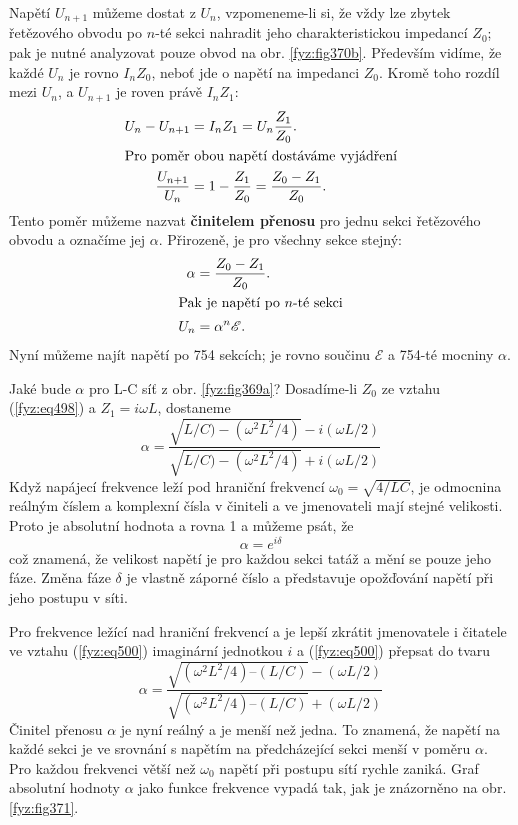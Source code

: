 {  Napětí \(U_{n+1}\) můžeme dostat z \(U_n\), vzpomeneme-li si, že vždy lze zbytek řetězového 
  obvodu po \(n\)-té sekci nahradit jeho charakteristickou impedancí \(Z_0\); pak je nutné 
  analyzovat pouze obvod na obr. \ref{fyz:fig370b}. Především vidíme, že každé \(U_n\) je rovno 
  \(I_nZ_0\), neboť jde o napětí na impedanci \(Z_0\). Kromě toho rozdíl mezi \(U_n\), a 
  \(U_{n+1}\) je roven právě \(I_nZ_1\):
  \begin{align*}
    U_n - U_{n+1}       &= I_nZ_1 = U_n\frac{Z_1}{Z_0}.  \\
    \shortintertext{Pro poměr obou napětí dostáváme vyjádření} 
    \frac{U_{n+1}}{U_n} &= 1 - \frac{Z_1}{Z_0} = \frac{Z_0 -Z_1}{Z_0}.
  \end{align*}
  Tento poměr můžeme nazvat \textbf{činitelem přenosu} pro jednu sekci řetězového obvodu a označíme 
  jej \(\alpha\). Přirozeně, je pro všechny sekce stejný: 
  \begin{align*}
    \alpha  &= \frac{Z_0 -Z_1}{Z_0}.  \\
    \shortintertext{Pak je napětí po \(n\)-té sekci} 
    U_n     &= \alpha^n\mathscr{E}.
  \end{align*}
  Nyní můžeme najít napětí po \num{754} sekcích; je rovno součinu \(\mathscr{E}\) a \num{754}-té 
  mocniny \(\alpha\). 
  
  Jaké bude \(\alpha\) pro L-C síť z obr. \ref{fyz:fig369a}? Dosadíme-li \(Z_0\) ze vztahu 
  (\ref{fyz:eq498}) a \(Z_1 =i\omega L\), dostaneme
  \begin{equation}\label{fyz:eq500}
    \alpha = \dfrac{\sqrt{L/C) - (\omega^2L^2/4)} - i(\omega L/2)}
                   {\sqrt{L/C) - (\omega^2L^2/4)} + i(\omega L/2)}
  \end{equation}
  Když napájecí frekvence leží pod hraniční frekvencí \(\omega_0 =\sqrt{4/LC}\), je odmocnina 
  reálným číslem a komplexní čísla v činiteli a ve jmenovateli mají stejné velikosti. Proto je 
  absolutní hodnota a rovna 1 a můžeme psát, že
  \begin{equation*}
    \alpha = e^{i\delta}
  \end{equation*}
  což znamená, že velikost napětí je pro každou sekci tatáž a mění se pouze jeho fáze. Změna fáze 
  \(\delta\) je vlastně záporné číslo a představuje opožďování napětí při jeho postupu v síti. 
  
  Pro frekvence ležící nad hraniční frekvencí a je lepší zkrátit jmenovatele i čitatele ve vztahu 
  (\ref{fyz:eq500}) imaginární jednotkou \(i\) a (\ref{fyz:eq500}) přepsat do tvaru
  \begin{equation}\label{fyz:eq501}
    \alpha = \dfrac{\sqrt{(\omega^2L^2/4) – (L/C)} - (\omega L/2)}
                   {\sqrt{(\omega^2L^2/4) – (L/C)} + (\omega L/2)}
  \end{equation}
  Činitel přenosu \(\alpha\) je nyní reálný a je menší než jedna. To znamená, že napětí na každé 
  sekci je ve srovnání s napětím na předcházející sekci menší v poměru \(\alpha\). Pro každou 
  frekvenci větší než \(\omega_0\) napětí při postupu sítí rychle zaniká. Graf absolutní hodnoty 
  \(\alpha\) jako funkce frekvence vypadá tak, jak je znázorněno na obr. \ref{fyz:fig371}. 
  
}
